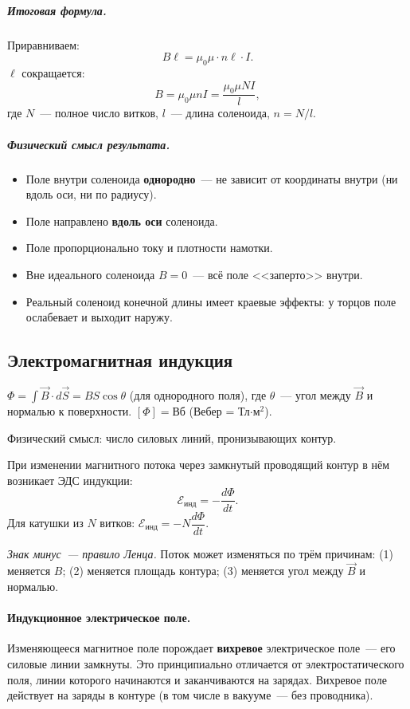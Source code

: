 \documentclass[12pt]{article}
\begin{document}
\subparagraph{Итоговая формула.}
Приравниваем:
\[
    B\ell = \mu_0\mu\cdot n\ell\cdot I.
\]
$\ell$ сокращается:
\[
    \boxed{B = \mu_0\mu nI = \frac{\mu_0\mu NI}{l},}
\]
где $N$~--- полное число витков, $l$~--- длина соленоида, $n = N/l$.

\subparagraph{Физический смысл результата.}
\begin{itemize}
    \item Поле внутри соленоида \textbf{однородно}~--- не зависит от координаты
          внутри (ни вдоль оси, ни по радиусу).
    \item Поле направлено \textbf{вдоль оси} соленоида.
    \item Поле пропорционально току и плотности намотки.
    \item Вне идеального соленоида $B = 0$~--- всё поле <<заперто>> внутри.
    \item Реальный соленоид конечной длины имеет краевые эффекты:
          у торцов поле ослабевает и выходит наружу.
\end{itemize}

\subsection{Электромагнитная индукция}

\begin{definition}
    $\Phi = \int\vec{B}\cdot d\vec{S} = BS\cos\theta$ (для однородного поля),
    где $\theta$~--- угол между $\vec{B}$ и нормалью к поверхности.
    $[\Phi] = \text{Вб}$ (Вебер = Тл$\cdot$м$^2$).

    Физический смысл: число силовых линий, пронизывающих контур.
\end{definition}

\begin{law}
    При изменении магнитного потока через замкнутый проводящий контур в нём
    возникает ЭДС индукции:
    \[
        \mathcal{E}_{\text{инд}} = -\frac{d\Phi}{dt}.
    \]
    Для катушки из $N$ витков: $\mathcal{E}_{\text{инд}} = -N\dfrac{d\Phi}{dt}$.

    \textit{Знак минус~--- правило Ленца.} Поток может изменяться по трём
    причинам: (1) меняется $B$; (2) меняется площадь контура; (3) меняется угол
    между $\vec{B}$ и нормалью.
\end{law}

\paragraph{Индукционное электрическое поле.}
Изменяющееся магнитное поле порождает \textbf{вихревое} электрическое поле~---
его силовые линии замкнуты. Это принципиально отличается от электростатического
поля, линии которого начинаются и заканчиваются на зарядах. Вихревое поле
действует на заряды в контуре (в том числе в вакууме~--- без проводника).
\end{document}
